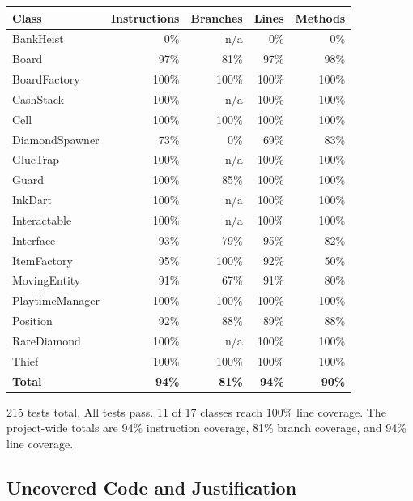 \documentclass[12pt]{article}
\begin{document}
\begin{center}
\begin{tabular}{l r r r r}
\hline
\textbf{Class} & \textbf{Instructions} & \textbf{Branches} & \textbf{Lines} & \textbf{Methods} \\
\hline
BankHeist         & 0\%   & n/a   & 0\%   & 0\%   \\
Board             & 97\%  & 81\%  & 97\%  & 98\%  \\
BoardFactory      & 100\% & 100\% & 100\% & 100\% \\
CashStack         & 100\% & n/a   & 100\% & 100\% \\
Cell              & 100\% & 100\% & 100\% & 100\% \\
DiamondSpawner    & 73\%  & 0\%   & 69\%  & 83\%  \\
GlueTrap          & 100\% & n/a   & 100\% & 100\% \\
Guard             & 100\% & 85\%  & 100\% & 100\% \\
InkDart           & 100\% & n/a   & 100\% & 100\% \\
Interactable      & 100\% & n/a   & 100\% & 100\% \\
Interface         & 93\%  & 79\%  & 95\%  & 82\%  \\
ItemFactory       & 95\%  & 100\% & 92\%  & 50\%  \\
MovingEntity      & 91\%  & 67\%  & 91\%  & 80\%  \\
PlaytimeManager   & 100\% & 100\% & 100\% & 100\% \\
Position          & 92\%  & 88\%  & 89\%  & 88\%  \\
RareDiamond       & 100\% & n/a   & 100\% & 100\% \\
Thief             & 100\% & 100\% & 100\% & 100\% \\
\hline
\textbf{Total}    & \textbf{94\%} & \textbf{81\%} & \textbf{94\%} & \textbf{90\%} \\
\hline
\end{tabular}
\end{center}

215 tests total. All tests pass. 11 of 17 classes reach 100\% line coverage. The project-wide totals are 94\% instruction coverage, 81\% branch coverage, and 94\% line coverage.

\subsection{Uncovered Code and Justification}
\end{document}
